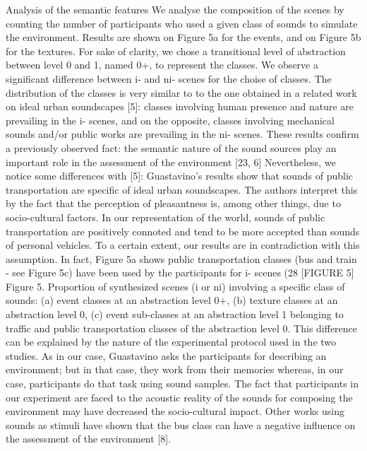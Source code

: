 Analysis of the semantic features We analyse the composition of the scenes by counting the number of participants who used a given class of sounds to simulate the environment. Results are shown on Figure 5a for the events, and on Figure 5b for the textures. For sake of clarity, we chose a transitional level of abstraction between level 0 and 1, named 0+, to represent the classes. We observe a significant difference between i- and ni- scenes for the choise of classes. The distribution of the classes is very similar to to the one obtained in a related work on ideal urban soundscapes [5]: classes involving human presence and nature are prevailing in the i- scenes, and on the opposite, classes involving mechanical sounds and/or public works are prevailing in the ni- scenes. These results confirm a previously observed fact: the semantic nature of the sound sources play an important role in the assessment of the environment [23, 6] Nevertheless, we notice some differences with [5]: Guastavino’s results show that sounds of public transportation are specific of ideal urban soundscapes. The authors interpret this by the fact that the perception of pleasantness is, among other things, due to socio-cultural factors. In our representation of the world, sounds of public transportation are positively connoted and tend to be more accepted than sounds of personal vehicles. To a certain extent, our results are in contradiction with this assumption. In fact, Figure 5a shows public transportation classes (bus and train - see Figure 5c) have been used by the participants for i- scenes (28%
[FIGURE 5] Figure 5. Proportion of synthesized scenes (i or ni) involving a specific class of sounds: (a) event classes at an abstraction level 0+, (b) texture classes at an abstraction level 0, (c) event sub-classes at an abstraction level 1 belonging to traffic and public transportation classes of the abstraction level 0.
This difference can be explained by the nature of the experimental protocol used in the two studies. As in our case, Guastavino asks the participants for describing an environment; but in that case, they work from their memories whereas, in our case, participants do that task using sound samples. The fact that participants in our experiment are faced to the acoustic reality of the sounds for composing the environment may have decreased the socio-cultural impact. Other works using sounds as stimuli have shown that the bus class can have a negative influence on the assessment of the environment [8].

